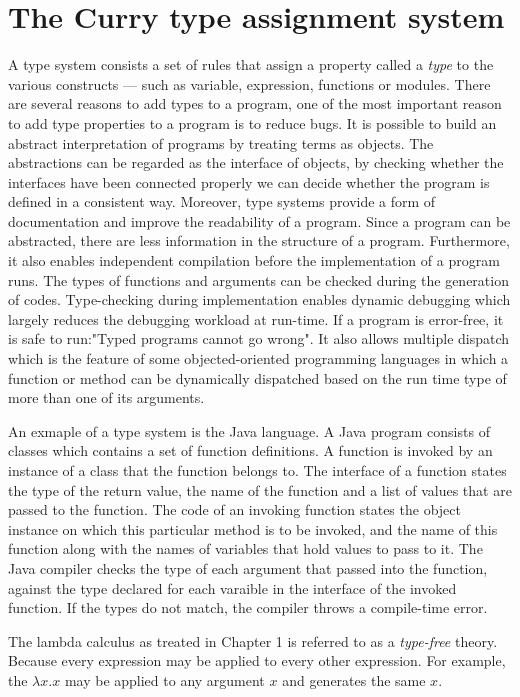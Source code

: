 \documentclass[a4paper,11pt,twoside]{report}
\begin{document}
\chapter{The Curry type assignment system}

A type system consists a set of rules that assign a property called a \textit{type} to the various constructs --- such as variable, expression, functions or modules. There are several reasons to add types to a program, one of the most important reason to add type properties to a program is to reduce bugs. It is possible to build an abstract interpretation of programs by treating terms as objects. The abstractions can be regarded as the interface of objects, by checking whether the interfaces have been connected properly we can decide whether the program is defined in a consistent way. Moreover, type systems provide a form of documentation and improve the readability of a program. Since a program can be abstracted, there are less information in the structure of a program. Furthermore, it also enables independent compilation before the implementation of a program runs. The types of functions and arguments can be checked during the generation of codes. Type-checking during implementation enables dynamic  debugging which largely reduces the debugging workload at run-time. If a program is error-free, it is safe to run:"Typed programs cannot go wrong". It also allows multiple dispatch which is the feature of some objected-oriented programming languages in which a function or method can be dynamically dispatched based on the run time type of more than one of its arguments.
 
An exmaple of a type system is the Java language. A Java program consists of classes which contains a set of function definitions. A function is invoked by an instance of a class that the function belongs to. The interface of a function states the type of the return value, the name of the function and a list of values that are passed to the function. The code of an invoking function states the object instance on which this particular method is to be invoked, and the name of this function along with the names of variables that hold values to pass to it. The Java compiler checks the type of each argument that passed into the function, against the type declared for each varaible in the interface of the invoked function. If the types do not match, the compiler throws a compile-time error.

The lambda calculus as treated in Chapter 1 is referred to as a \textit{type-free} theory. Because every expression may be applied to every other expression. For example, the $\lambda x.x$ may be applied to any argument $x$ and generates the same $x$. 
\end{document}
